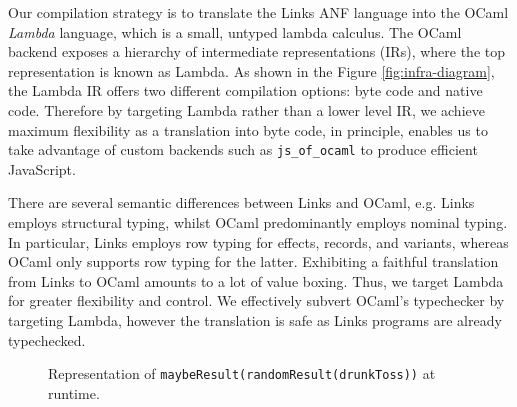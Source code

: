 \documentclass[12pt,mscres,cdtppar,twoside,openright,logo,rightchapter,normalheadings]{infthesis}
\theoremstyle{definition}
\begin{document}
%

Our compilation strategy is to translate the Links ANF language into the OCaml
\emph{Lambda} language, which is a small, untyped lambda calculus. The OCaml
backend exposes a hierarchy of intermediate representations (IRs), where the
top representation is known as Lambda. As shown in the Figure
\ref{fig:infra-diagram}, the Lambda IR offers two different compilation
options: byte code and native code. Therefore by targeting Lambda rather than
a lower level IR, we achieve maximum flexibility as a translation into byte
code, in principle, enables us to take advantage of custom backends such as
\texttt{js\_of\_ocaml} to produce efficient JavaScript.

%

There are several semantic differences between Links and OCaml, e.g. Links
employs structural typing, whilst OCaml predominantly employs nominal typing.
In particular, Links employs row typing for effects, records, and variants,
whereas OCaml only supports row typing for the latter. Exhibiting a faithful
translation from Links to OCaml amounts to a lot of value boxing. Thus, we
target Lambda for greater flexibility and control.  We effectively subvert
OCaml's typechecker by targeting Lambda, however the translation is safe as
Links programs are already typechecked.

\begin{figure}
\centering
{}
\caption{Representation of \lstinline$maybeResult(randomResult(drunkToss))$ at runtime.}\label{fig:rtstack}
\end{figure}
\end{document}
